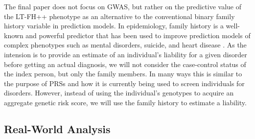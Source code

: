 The final paper does not focus on GWAS, but rather on the predictive value of the LT-FH++ phenotype as an alternative to the conventional binary family history variable in prediction models. In epidemiology, family history is a well-known and powerful predictor that has been used to improve prediction models of complex phenotypes such as mental disorders, suicide, and heart disease \cite{runeson2003family,ejlskov2021prediction,williams2001usefulness}. As the intension is to provide an estimate of an individual's liability for a given disorder before getting an actual diagnosis, we will not consider the case-control status of the index person, but only the family members. In many ways this is similar to the purpose of PRSs and how it is currently being used to screen individuals for disorders. However, instead of using the individual's genotypes to acquire an aggregate genetic risk score, we will use the family history to estimate a liability. 


\subsection{Real-World Analysis}

